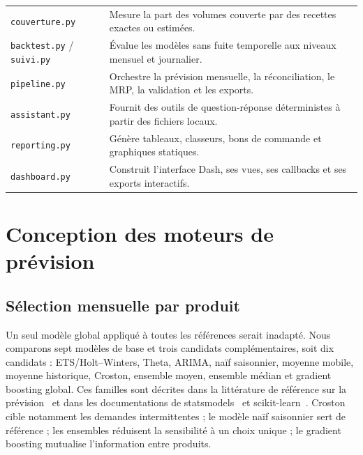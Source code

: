\begin{longtable}{p{4.5cm}p{9.9cm}}
\texttt{couverture.py} & Mesure la part des volumes couverte par des recettes exactes ou estimées. \\
\texttt{backtest.py} / \texttt{suivi.py} & Évalue les modèles sans fuite temporelle aux niveaux mensuel et journalier. \\
\texttt{pipeline.py} & Orchestre la prévision mensuelle, la réconciliation, le MRP, la validation et les exports. \\
\texttt{assistant.py} & Fournit des outils de question-réponse déterministes à partir des fichiers locaux. \\
\texttt{reporting.py} & Génère tableaux, classeurs, bons de commande et graphiques statiques. \\
\texttt{dashboard.py} & Construit l'interface Dash, ses vues, ses callbacks et ses exports interactifs. \\
\bottomrule
\end{longtable}
\normalsize

\section{Conception des moteurs de prévision}

\subsection{Sélection mensuelle par produit}

Un seul modèle global appliqué à toutes les références serait inadapté. Nous
comparons sept modèles de base et trois candidats complémentaires, soit dix
candidats : ETS/Holt--Winters, Theta, ARIMA, naïf saisonnier, moyenne mobile,
moyenne historique, Croston, ensemble moyen, ensemble médian et gradient boosting
global. Ces familles sont décrites dans la littérature de référence sur la
prévision~\cite{hyndman2021} et dans les documentations de
statsmodels~\cite{statsmodelsHW} et scikit-learn~\cite{sklearnGBM}. Croston cible
notamment les demandes intermittentes ; le modèle naïf
saisonnier sert de référence ; les ensembles réduisent la sensibilité à un choix
unique ; le gradient boosting mutualise l'information entre produits.

